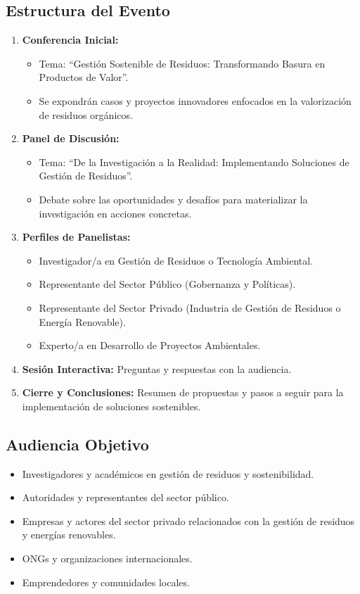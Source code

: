 \documentclass[11pt,a4paper]{article}
\begin{document}
\subsection{Estructura del Evento}
\begin{enumerate}[label=\arabic*.]
    \item \textbf{Conferencia Inicial:} 
    \begin{itemize}
        \item Tema: ``Gestión Sostenible de Residuos: Transformando Basura en Productos de Valor''.
        \item Se expondrán casos y proyectos innovadores enfocados en la valorización de residuos orgánicos.
    \end{itemize}
    \item \textbf{Panel de Discusión:} 
    \begin{itemize}
        \item Tema: ``De la Investigación a la Realidad: Implementando Soluciones de Gestión de Residuos''.
        \item Debate sobre las oportunidades y desafíos para materializar la investigación en acciones concretas.
    \end{itemize}
    \item \textbf{Perfiles de Panelistas:}
    \begin{itemize}
        \item Investigador/a en Gestión de Residuos o Tecnología Ambiental.
        \item Representante del Sector Público (Gobernanza y Políticas).
        \item Representante del Sector Privado (Industria de Gestión de Residuos o Energía Renovable).
        \item Experto/a en Desarrollo de Proyectos Ambientales.
    \end{itemize}
    \item \textbf{Sesión Interactiva:} Preguntas y respuestas con la audiencia.
    \item \textbf{Cierre y Conclusiones:} Resumen de propuestas y pasos a seguir para la implementación de soluciones sostenibles.
\end{enumerate}

\subsection{Audiencia Objetivo}
\begin{itemize}[leftmargin=*, label={--}]
    \item Investigadores y académicos en gestión de residuos y sostenibilidad.
    \item Autoridades y representantes del sector público.
    \item Empresas y actores del sector privado relacionados con la gestión de residuos y energías renovables.
    \item ONGs y organizaciones internacionales.
    \item Emprendedores y comunidades locales.
\end{itemize}
\end{document}
